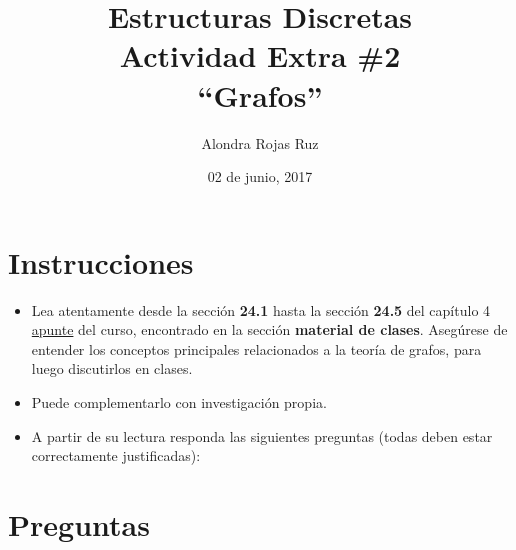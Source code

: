 \documentclass[spanish, fleqn]{article}
\title{Estructuras Discretas \\
       Actividad Extra \#2 \\
       ``Grafos''}
\author{Alondra Rojas Ruz}
\date{02 de junio, 2017}
\begin{document}
\maketitle
\thispagestyle{empty}


\section*{Instrucciones}

\begin{itemize}
    \item Lea atentamente desde la sección \textbf{24.1} hasta la sección \textbf{24.5} del capítulo 4 \href{https://moodle.inf.utfsm.cl/pluginfile.php?file=\%2F64673\%2Fmod_resource\%2Fcontent\%2F2\%2Fclases-0.83.pdf}{apunte} del curso, encontrado en la sección \textbf{material de clases}. Asegúrese de entender los conceptos principales relacionados a la teoría de grafos, para luego discutirlos en clases.
    \item Puede complementarlo con investigación propia.
    \item A partir de su lectura responda las siguientes preguntas (todas deben estar correctamente justificadas):
    
\end{itemize}
    
\section*{Preguntas}
    
\end{document}
